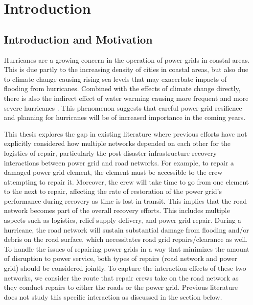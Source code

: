 \chapter{Introduction}
%

\section{Introduction and Motivation}
Hurricanes are a growing concern in the operation of power grids in coastal areas. This is due partly to the increasing density of cities in coastal areas, but also due to climate change causing rising sea levels that may exacerbate impacts of flooding from hurricanes. Combined with the effects of climate change directly, there is also the indirect effect of water warming causing more frequent and more severe hurricanes \cite{MannEA2006}. This phenomenon suggests that careful power grid resilience and planning for hurricanes will be of increased importance in the coming years.

This thesis explores the gap in existing literature where previous efforts have not explicitly considered how multiple networks depended on each other for the logistics of repair, particularly the post-disaster infrastructure recovery interactions between power grid and road networks. For example, to repair a damaged power grid element, the element must be accessible to the crew attempting to repair it. Moreover, the crew will take time to go from one element to the next to repair, affecting the rate of restoration of the power grid's performance during recovery as time is lost in transit. This implies that the road network becomes part of the overall recovery efforts. This includes multiple aspects such as logistics, relief supply delivery, and power grid repair. During a hurricane, the road network will sustain substantial damage from flooding and/or debris on the road surface, which necessitates road grid repairs/clearance as well. To handle the issues of repairing power grids in a way that minimizes the amount of disruption to power service, both types of repairs (road network and power grid) should be considered jointly. To capture the interaction effects of these two networks, we consider the route that repair crews take on the road network as they conduct repairs to either the roads or the power grid. Previous literature does not study this specific interaction as discussed in the section below.

